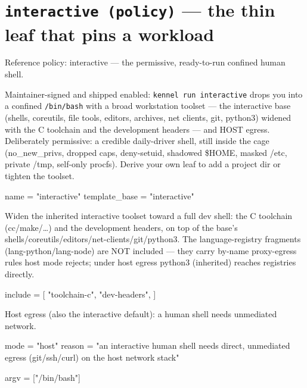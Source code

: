 \hypertarget{interactive-policy-the-thin-leaf-that-pins-a-workload}{%
\section{\texorpdfstring{\texttt{interactive\ (policy)} --- the thin
leaf that pins a
workload}{interactive (policy) --- the thin leaf that pins a workload}}\label{interactive-policy-the-thin-leaf-that-pins-a-workload}}

Reference policy: interactive --- the permissive, ready-to-run confined
human shell.

Maintainer-signed and shipped enabled: \texttt{kennel\ run\ interactive}
drops you into a confined \texttt{/bin/bash} with a broad workstation
toolset --- the interactive base (shells, coreutils, file tools,
editors, archives, net clients, git, python3) widened with the C
toolchain and the development headers --- and HOST egress. Deliberately
permissive: a credible daily-driver shell, still inside the cage
(no\_new\_privs, dropped caps, deny-setuid, shadowed \$HOME, masked
/etc, private /tmp, self-only procfs). Derive your own leaf to add a
project dir or tighten the toolset.

\begin{kennelcode}
name = "interactive"
template_base = "interactive"
\end{kennelcode}

Widen the inherited interactive toolset toward a full dev shell: the C
toolchain (cc/make/\ldots) and the development headers, on top of the
base's shells/coreutils/editors/net-clients/git/python3. The
language-registry fragments (lang-python/lang-node) are NOT included ---
they carry by-name proxy-egress rules host mode rejects; under host
egress python3 (inherited) reaches registries directly.

\begin{kennelcode}
include = [
    "toolchain-c",
    "dev-headers",
]
\end{kennelcode}

Host egress (also the interactive default): a human shell needs
unmediated network.

\begin{kennelcode}
[net]
mode = "host"
reason = "an interactive human shell needs direct, unmediated egress (git/ssh/curl) on the host network stack"
\end{kennelcode}

\begin{kennelcode}
[workload]
argv = ["/bin/bash"]
\end{kennelcode}

